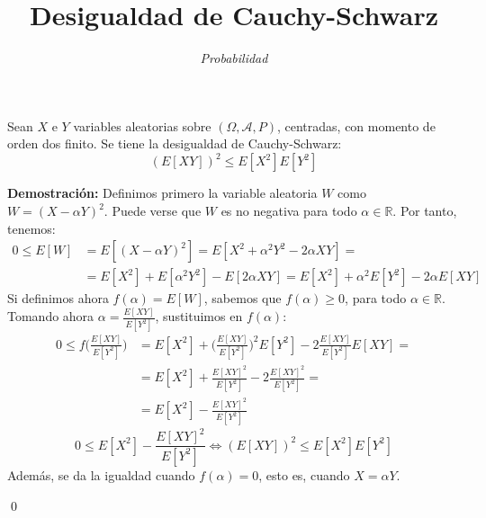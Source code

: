 \documentclass[12pt,a4paper]{article}
\renewenvironment{proof}{\textbf{Demostración:}}{\qed} %
\begin{document}
\title{\Huge{\textbf{Desigualdad de Cauchy-Schwarz}}}
\author{\textit{Probabilidad}}
\date{}
\maketitle


Sean $X$ e $Y$ variables aleatorias sobre $(\Omega,\mathcal{A},P)$, centradas,
con momento de orden dos finito. Se tiene la desigualdad de Cauchy-Schwarz:
\begin{equation*}
(E[XY])^2\leq E[X^2]E[Y^2]
\end{equation*}

\begin{proof}
Definimos primero la variable aleatoria $W$ como $W=(X-\alpha Y)^2$. Puede
verse que $W$ es no negativa para todo $\alpha\in\mathbb{R}$. Por tanto, 
tenemos: 
\begin{align*}
0\leq E[W] &= E[(X-\alpha Y)^2] = E[X^2+\alpha^2Y^2-2\alpha XY] =\\
&= E[X^2]+E[\alpha^2Y^2]-E[2\alpha XY] = E[X^2]+\alpha^2E[Y^2]-2\alpha E[XY]
\end{align*}
Si definimos ahora $f(\alpha)=E[W]$, sabemos que $f(\alpha)\geq 0$, para todo
$\alpha\in\mathbb{R}$. Tomando ahora $\alpha=\frac{E[XY]}{E[Y^2]}$, sustituimos
en $f(\alpha)$:
\begin{align*}
0\leq f\Big(\frac{E[XY]}{E[Y^2]}\Big) &= E[X^2]+\Big(\frac{E[XY]}{E[Y^2]}
\Big)^2E[Y^2]-2\frac{E[XY]}{E[Y^2]}E[XY] =\\
&= E[X^2]+\frac{E[XY]^2}{E[Y^2]}- 2\frac{E[XY]^2}{E[Y^2]} =\\
&= E[X^2]-\frac{E[XY]^2}{E[Y^2]} 
\end{align*}
\begin{equation*}
0\leq E[X^2]-\frac{E[XY]^2}{E[Y^2]}\Leftrightarrow (E[XY])^2\leq E[X^2]E[Y^2]
\end{equation*}
Además, se da la igualdad cuando $f(\alpha)=0$, esto es, cuando $X=\alpha Y$.

\end{proof}
\end{document}
